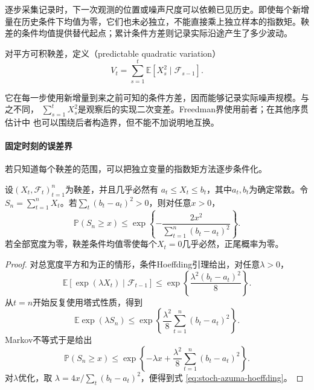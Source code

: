 逐步采集记录时，下一次观测的位置或噪声尺度可以依赖已见历史。即使每个新增量在历史条件下均值为零，它们也未必独立，不能直接乘上独立样本的指数矩。鞅差的条件均值提供替代起点；累计条件方差则记录实际沿途产生了多少波动。
\begin{definition}[可预测二次变差]
  \label{def:stoch-predictable-quadratic-variation}
对平方可积鞅差，定义（predictable quadratic variation）
\begin{equation}
  V_t=\sum_{s=1}^{t}\mathbb{E}[X_s^2\mid\mathcal{F}_{s-1}].
  \label{eq:stoch-predictable-quadratic-variation}
\end{equation}
\end{definition}
它在每一步使用新增量到来之前可知的条件方差，因而能够记录实际噪声规模。与之不同，
$\sum_{s=1}^{t}X_s^2$是观察后的实现二次变差。Freedman界使用前者；在其他序贯估计中
也可以围绕后者构造界，但不能不加说明地互换。

\paragraph{固定时刻的误差界}
\label{sec:rv-fixed-time}
若只知道每个鞅差的范围，可以把独立变量的指数矩方法逐步条件化。

\begin{theorem}
  \label{thm:stoch-azuma-hoeffding}
  设$(X_t,\mathcal{F}_t)_{t=1}^{n}$为鞅差，并且几乎必然有
  $a_t\leq X_t\leq b_t$，其中$a_t,b_t$为确定常数。令
  $S_n=\sum_{t=1}^{n}X_t$。若$\sum_t(b_t-a_t)^2>0$，则对任意$x>0$，
  \begin{equation}
    \mathbb{P}(S_n\geq x)\leq\exp\left\{
      -\frac{2x^2}{\sum_{t=1}^{n}(b_t-a_t)^2}
    \right\}.
    \label{eq:stoch-azuma-hoeffding}
  \end{equation}
若全部宽度为零，鞅差条件均值零使每个$X_t=0$几乎必然，正尾概率为零。
\end{theorem}

\begin{proof}
对总宽度平方和为正的情形，条件Hoeffding引理给出，对任意$\lambda>0$，
\[
  \mathbb{E}[
    \exp(\lambda X_t)
    \mid\mathcal{F}_{t-1}]
  \leq
  \exp\left\{
    \frac{\lambda^2(b_t-a_t)^2}{8}
  \right\}.
\]
从$t=n$开始反复使用塔式性质，得到
\[
  \mathbb{E}\exp(\lambda S_n)
  \leq
  \exp\left\{
    \frac{\lambda^2}{8}
    \sum_{t=1}^{n}(b_t-a_t)^2
  \right\}.
\]
Markov不等式于是给出
\[
  \mathbb{P}(S_n\geq x)
  \leq
  \exp\left\{
    -\lambda x+
    \frac{\lambda^2}{8}
    \sum_{t=1}^{n}(b_t-a_t)^2
  \right\}.
\]
对$\lambda$优化，取
$\lambda=4x/\sum_t(b_t-a_t)^2$，便得到式
\eqref{eq:stoch-azuma-hoeffding}。
\end{proof}

